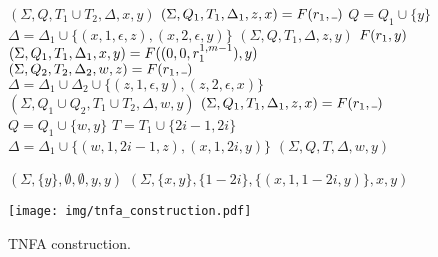 \documentclass[AMA,STIX1COL]{WileyNJD-v2}
\newcommand{\Xund}{\rule{.4em}{.4pt}}
\begin{document}
\begin{figure*}
\begin{multicols}{2}
\begin{algorithm}[H]
{{            \Return $(\Sigma, Q, T_1 \cup T_2, \Delta, x, y)$ \;
        }
        \BlankLine
         {
            $(\Sigma, Q_1, T_1, \Delta_1, z, x) = \retonfa (r_1, \Xund)$ \;
            $Q = Q_1 \cup \{y\}$ \;
            $\Delta = \Delta_1 \cup \{(x,1,\epsilon,z), (x,2,\epsilon,y)\}$ \;
            \Return $(\Sigma, Q, T_1, \Delta, z, y)$ \;
        }
        \BlankLine
         {
            \Return $F (r_1, y)$ \;
        }
        \BlankLine
         {
            $(\Sigma, Q_1, T_1, \Delta_1, x, y) = F ((0, 0, r_1^{1,m-1}), y)$ \;
            $(\Sigma, Q_2, T_2, \Delta_2, w, z) = \retonfa (r_1, \Xund)$ \;
            $\Delta = \Delta_1 \cup \Delta_2 \cup \{(z,1,\epsilon,y), (z,2,\epsilon,x)\}$ \;
            \Return $(\Sigma, Q_1 \cup Q_2, T_1 \cup T_2, \Delta, w, y)$ \;
        }
        \BlankLine
        \BlankLine
        \ElseIf {$r = (i, \Xund, r_1) \mid_{i \neq 0}$} {
            $(\Sigma, Q_1, T_1, \Delta_1, z, x) = \retonfa (r_1, \Xund)$ \;
            $Q = Q_1 \cup \{w, y\}$ \;
            $T = T_1 \cup \{2i\!-\!1, 2i\}$ \;
            $\Delta = \Delta_1 \cup \{(w,1,2i\!-\!1,z), (x,1,2i,y)\}$ \;
            \Return $(\Sigma, Q, T, \Delta, w, y)$ \;
        }

    }
    \end{algorithm}


    \begin{algorithm}[H] \DontPrintSemicolon {} 
     {
        \If {$r = (0, 0, \Xund)$} {
            \Return $(\Sigma, \{y\}, \emptyset, \emptyset, y, y)$ \;
        }
        \BlankLine
        \ElseIf {$r = (i, \Xund, \Xund) \mid_{i \neq 0}$} {
            \Return $(\Sigma, \{x,y\}, \{1\!-\!2i\}, \{(x, 1, 1\!-\!2i, y)\}, x, y)$ \;
        }

    }
    \end{algorithm}


    \columnbreak


    \texttt{[image: img/tnfa\_construction.pdf]}


\end{multicols}
\vspace{-2em}
\begin{center}
\caption{TNFA construction.}
\end{center}
\end{figure*}
\end{document}
